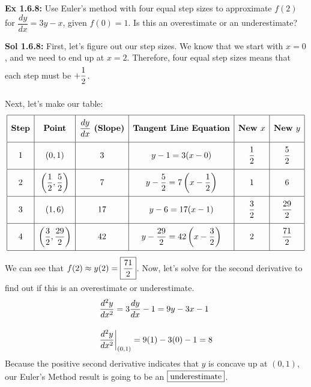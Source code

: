\begin{tcolorbox}[example]
    \textbf{Ex 1.6.8: } Use Euler's method with four equal step sizes to approximate $f(2)$ for $\dfrac{dy}{dx} = 3y - x$, given $f(0) = 1$. Is this an overestimate or an underestimate?
\end{tcolorbox} 
\begin{tcolorbox}[solution]
    \textbf{Sol 1.6.8: } First, let's figure out our step sizes. We know that we start with $x = 0$, and we need to end up at $x = 2$. Therefore, four equal step sizes means that each step must be $+\dfrac{1}{2} \forcespace$. \par
    Next, let's make our table: \begin{align*}
        \def\arraystretch{2.2} 
        \begin{array}{|c|c|c|c|c|c|}
            \hline
            \textbf{Step} & \textbf{Point} & \dfrac{dy}{dx} \textbf{ (Slope)} & \textbf{Tangent Line Equation} & \textbf{New } x & \textbf{New } y \\[5.5pt] \hline
            1 & (0, 1) & 3 & y - 1 = 3(x - 0) & \dfrac{1}{2} & \dfrac{5}{2} \\[5.5pt] \hline
            2 & \left(\dfrac{1}{2}, \dfrac{5}{2}\right) & 7 & y - \dfrac{5}{2} = 7\left(x - \dfrac{1}{2}\right) & 1 & 6 \\[5.5pt] \hline
            3 & (1, 6) & 17 & y - 6 = 17(x - 1) & \dfrac{3}{2} & \dfrac{29}{2} \\[5.5pt] \hline
            4 & \left(\dfrac{3}{2}, \dfrac{29}{2}\right) & 42 & y - \dfrac{29}{2} = 42\left(x - \dfrac{3}{2}\right) & 2 & \dfrac{71}{2} \\[5.5pt]
            \hline
        \end{array}
    \end{align*}
    We can see that $f(2) \approx y(2) = \boxed{\dfrac{71}{2}} \forcespace$. Now, let's solve for the second derivative to find out if this is an overestimate or underestimate. \begin{align*}
        & \dfrac{d^2y}{dx^2} = 3\dfrac{dy}{dx} - 1 = 9y - 3x - 1 \\[11pt]
        & \dfrac{d^2y}{dx^2} \bigg|_{(0, 1)} = 9(1) - 3(0) - 1 = 8
    \end{align*}
    Because the positive second derivative indicates that $y$ is concave up at $(0, 1)$, our Euler's Method result is going to be an $\boxed{\text{underestimate}} \smallforcespace$.
\end{tcolorbox}

\newpage

